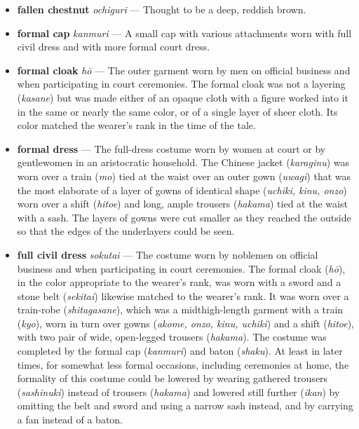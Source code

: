 \documentclass{article}
\begin{document}
\begin{multicols}{3}
\begin{footnotesize}
\begin{itemize}[
			label=,
			leftmargin=0em,
			rightmargin=-1.5em,
			itemindent=-2em,
			nosep,
		]
		\item \textbf{fallen chestnut} \textit{ochiguri} --- Thought to be a deep, reddish brown.

		\item \textbf{formal cap} \textit{kanmuri} --- A small cap with various attachments worn with full civil dress and with more formal court dress.

		\item \textbf{formal cloak} \textit{hō} --- The outer garment worn by men on official business and when participating in court ceremonies. The formal cloak was not a layering (\textit{kasane}) but was made either of an opaque cloth with a figure worked into it in the same or nearly the same color, or of a single layer of sheer cloth. Its color matched the wearer's rank in the time of the tale.

		\item \textbf{formal dress} --- The full-dress costume worn by women at court or by gentlewomen in an aristocratic household. The Chinese jacket (\textit{karaginu}) was worn over a train (\textit{mo}) tied at the waist over an outer gown (\textit{uwagi}) that was the most elaborate of a layer of gowns of identical shape (\textit{uchiki, kinu, onzo}) worn over a shift (\textit{hitoe}) and long, ample trousers (\textit{hakama}) tied at the waist with a sash. The layers of gowns were cut smaller as they reached the outside so that the edges of the underlayers could be seen.

		\item \textbf{full civil dress} \textit{sokutai} --- The costume worn by noblemen on official business and when participating in court ceremonies. The formal cloak (\textit{hō}), in the color appropriate to the wearer's rank, was worn with a sword and a stone belt (\textit{sekitai}) likewise matched to the wearer's rank. It was worn over a train-robe (\textit{shitagasane}), which was a midthigh-length garment with a train (\textit{kyo}), worn in turn over gowns (\textit{akome, onzo, kinu, uchiki}) and a shift (\textit{hitoe}), with two pair of wide, open-legged trousers (\textit{hakama}). The costume was completed by the formal cap (\textit{kanmuri}) and baton (\textit{shaku}). At least in later times, for somewhat less formal occasions, including ceremonies at home, the formality of this costume could be lowered by wearing gathered trousers (\textit{sashinuki}) instead of trousers (\textit{hakama}) and lowered still further (\textit{ikan}) by omitting the belt and sword and using a narrow sash instead, and by carrying a fan instead of a baton.


\end{itemize}
\end{footnotesize}
\end{multicols}
\end{document}
